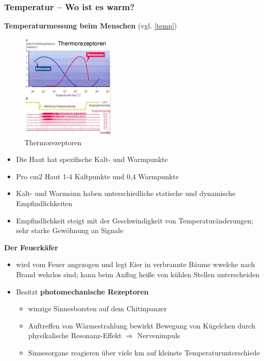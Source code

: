 \subsubsection{Temperatur – Wo ist es warm?}
\textbf{Temperaturmessung beim Menschen} (vgl. \autoref{temp})
\begin{figure}[h!]
	\centering
	\includegraphics[width=0.4\textwidth]{figures/ch04_temp.png}
	\caption{Thermorezeptoren}
	\label{temp}
\end{figure}
\begin{itemize}
\setlength\itemsep{0em}
\item Die Haut hat spezifische Kalt- und Warmpunkte
\item Pro cm2 Haut 1-4 Kaltpunkte und 0,4 Warmpunkte
\item Kalt- und Warmsinn haben unterschiedliche statische und dynamische Empfindlichkeiten
\item Empfindlichkeit steigt mit der Geschwindigkeit von Temperaturänderungen; sehr starke Gewöhnung an Signale
\end{itemize}
\noindent
\textbf{Der Feuerkäfer}
\begin{itemize}
\setlength\itemsep{0em}
\item wird vom Feuer angezogen und legt Eier in verbrannte Bäume wwelche nach Brand \glqq wehrlos\grqq{} sind; kann beim Anflug heiße von kühlen Stellen unterscheiden
\item Besitzt \textbf{photomechanische Rezeptoren}
\begin{itemize}
\item winzige Sinnesborsten auf dem Chitinpanzer
\item Auftreffen von Wärmestrahlung bewirkt Bewegung von Kügelchen durch physikalische Resonanz-Effekt $\Rightarrow$ Nervenimpuls
\item Sinnesorgane reagieren über viele km auf kleinste Temperaturunterschiede
\end{itemize}
\end{itemize}
